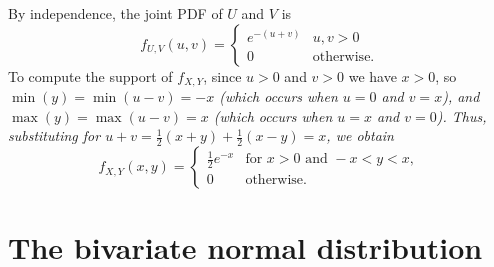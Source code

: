 \begin{solution}
By independence, the joint PDF of $U$ and $V$ is 
\[
f_{U,V}(u,v) 
	= \begin{cases}
		e^{-(u+v)}		& u,v > 0 \\
		0				& \text{otherwise.}
\end{cases}
\]
To compute the support of $f_{X,Y}$, since $u>0$ and $v>0$ we have $x>0$, so
\bit
\it $\min(y) = \min(u-v) = -x$ (which occurs when $u=0$ and $v=x$), and
\it $\max(y) = \max(u-v) = x$ (which occurs when $u=x$ and $v=0$).
\eit
Thus, substituting for $u+v = \frac{1}{2}(x+y) + \frac{1}{2}(x-y) = x$, we obtain
\[
f_{X,Y}(x,y) = \begin{cases}
	\frac{1}{2}e^{-x}	& \text{for } x > 0 \text{ and } -x < y < x, \\
	0					& \text{otherwise.}
\end{cases}
\]
\een
\end{solution}


\section{The bivariate normal distribution}

